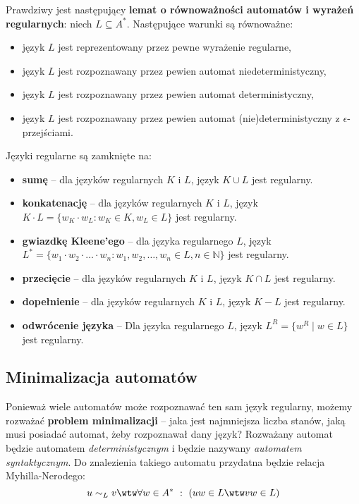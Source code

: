 Prawdziwy jest następujący \textbf{lemat o równoważności automatów i wyrażeń regularnych}: niech $L \subseteq A^*$. Następujące warunki są równoważne:
\begin{itemize}
    \item język $L$ jest reprezentowany przez pewne wyrażenie regularne,
    \item język $L$ jest rozpoznawany przez pewien automat niedeterministyczny,
    \item język $L$ jest rozpoznawany przez pewien automat deterministyczny,
    \item język $L$ jest rozpoznawany przez pewien automat (nie)deterministyczny z $\epsilon$-przejściami.
\end{itemize}

Języki regularne są zamknięte na:
\begin{itemize}
    \item \textbf{sumę} -- dla języków regularnych $K$ i $L$, język 
    $K \cup L$ jest regularny.
    \item \textbf{konkatenację} -- dla języków regularnych $K$ i $L$, język $K \cdot L = \{ w_K \cdot w_L : w_K \in K, w_L \in L \}$ jest regularny.
    \item \textbf{gwiazdkę Kleene'ego} -- dla języka regularnego $L$,
    język $L^* = \{ w_1 \cdot w_2 \cdot \ldots \cdot w_n : w_1, w_2, \ldots, w_n \in L,
    n \in \mathbb{N} \}$
    jest regularny.
    \item \textbf{przecięcie} -- dla języków regularnych $K$ i $L$, język $K \cap L$ jest regularny.
    \item \textbf{dopełnienie} -- dla języków regularnych $K$ i $L$, język $K - L$ jest regularny.
    \item \textbf{odwrócenie języka} -- Dla języka regularnego $L$, język $L^R = \{w^R \mid w \in L\}$ jest regularny.
\end{itemize}

\subsection{Minimalizacja automatów}
Ponieważ wiele automatów może rozpoznawać ten sam język regularny, możemy rozważać \textbf{problem minimalizacji} -- jaka jest najmniejsza liczba stanów, jaką musi posiadać automat, żeby rozpoznawał dany język? Rozważany automat będzie automatem \textit{deterministycznym} i będzie nazywany \textit{automatem syntaktycznym}. Do znalezienia takiego automatu przydatna będzie relacja Myhilla-Nerodego:
\[
u \sim_L v \wtw \forall w \in A^* \ : \ (uw \in L \wtw vw \in L)
\]

